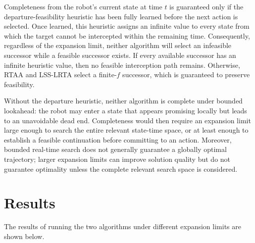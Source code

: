 \documentclass[11pt]{article}
\begin{document}
Completeness from the robot’s current state at time \(t\) is guaranteed only if the departure-feasibility heuristic has been fully learned before the next action is selected. Once learned, this heuristic assigns an infinite value to every state from which the target cannot be intercepted within the remaining time. Consequently, regardless of the expansion limit, neither algorithm will select an infeasible successor while a feasible successor exists. If every available successor has an infinite heuristic value, then no feasible interception path remains. Otherwise, RTAA and LSS-LRTA select a finite-\(f\) successor, which is guaranteed to preserve feasibility.

Without the departure heuristic, neither algorithm is complete under bounded lookahead: the robot may enter a state that appears promising locally but leads to an unavoidable dead end. Completeness would then require an expansion limit large enough to search the entire relevant state-time space, or at least enough to establish a feasible continuation before committing to an action. Moreover, bounded real-time search does not generally guarantee a globally optimal trajectory; larger expansion limits can improve solution quality but do not guarantee optimality unless the complete relevant search space is considered.

\section{Results}
The results of running the two algorithms under different expansion limits are shown below.


\clearpage
{}


\end{document}
